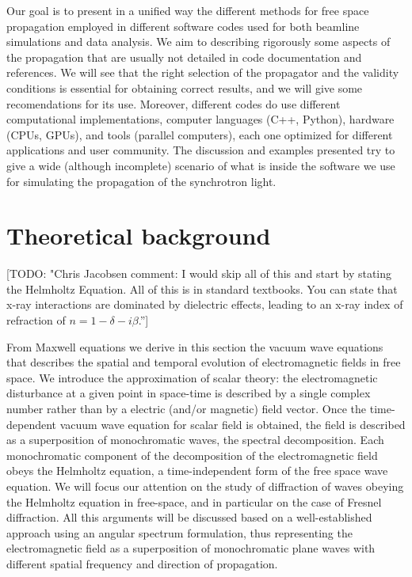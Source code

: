 \documentclass{iucr}              %
\newcommand{\todo}[1]{{\color{red}[TODO: "#1'']}}
\begin{document}
Our goal is to present in a unified way the different methods for free space propagation employed in different software codes used for both beamline simulations and data analysis. We aim to describing rigorously some aspects of the propagation that are usually not detailed in code documentation and references. We will see that the right selection of the propagator and the validity conditions is essential for obtaining correct results, and we will give some recomendations for its use. Moreover, different codes do use different computational implementations, computer languages (C++, Python), hardware (CPUs, GPUs), and tools (parallel computers), each one optimized for different applications and user community. The discussion and examples presented try to give a wide (although incomplete) scenario of what is inside the software we use for simulating the propagation of the synchrotron light.   

\section{Theoretical background}
\label{ch: theory}

\todo{Chris Jacobsen comment: I would skip all of this and start by stating the Helmholtz Equation.  All of this is in standard textbooks. You can state that x-ray interactions are dominated by dielectric effects, leading to an x-ray index of refraction of $n=1-\delta-i\beta$.}

From Maxwell equations we derive in this section the vacuum wave equations that describes the spatial and temporal evolution of electromagnetic fields in free space. We introduce the approximation of scalar theory: the electromagnetic disturbance at a given point in space-time is described by a single complex number rather than by a electric (and/or magnetic) field vector. Once the time-dependent vacuum wave equation for scalar field is obtained, the field is described as a superposition of monochromatic waves, the spectral decomposition. Each monochromatic component of the decomposition of the electromagnetic field obeys the Helmholtz equation, a time-independent form of the free space wave equation. We will focus our attention on the study of diffraction of waves obeying the Helmholtz equation in free-space, and in particular on the case of Fresnel diffraction. All this arguments will be discussed based on a well-established approach \cite{paganin_book} using an angular spectrum formulation, thus representing the electromagnetic field as a superposition of monochromatic plane waves with different spatial frequency and direction of propagation. 
\end{document}
